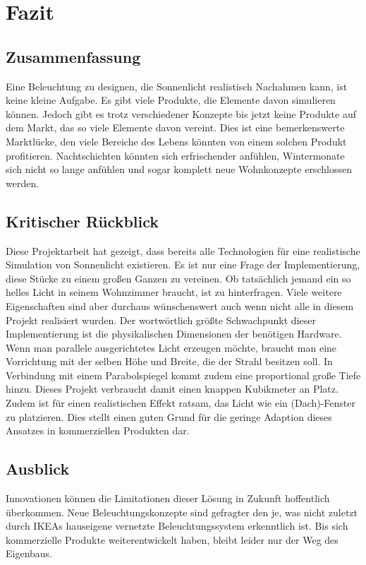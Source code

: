 \chapter{Fazit}

\section{Zusammenfassung}
Eine Beleuchtung zu designen, die Sonnenlicht realistisch Nachahmen kann, ist keine kleine Aufgabe. Es gibt viele Produkte, die Elemente davon simulieren können. Jedoch gibt es trotz verschiedener Konzepte bis jetzt keine Produkte auf dem Markt, das so viele Elemente davon vereint. Dies ist eine bemerkenswerte Marktlücke, den viele Bereiche des Lebens könnten von einem solchen Produkt profitieren. Nachtschichten könnten sich erfrischender anfühlen, Wintermonate sich nicht so lange anfühlen und sogar komplett neue Wohnkonzepte erschlossen werden.

\section{Kritischer Rückblick}
Diese Projektarbeit hat gezeigt, dass bereits alle Technologien für eine realistische Simulation von Sonnenlicht existieren. Es ist nur eine Frage der Implementierung, diese Stücke zu einem großen Ganzen zu vereinen. Ob tatsächlich jemand ein so helles Licht in seinem Wohnzimmer braucht, ist zu hinterfragen. Viele weitere Eigenschaften sind aber durchaus wünschenswert auch wenn nicht alle in diesem Projekt realisiert wurden. Der wortwörtlich größte Schwachpunkt dieser Implementierung ist die physikalischen Dimensionen der benötigen Hardware. Wenn man parallele ausgerichtetes Licht erzeugen möchte, braucht man eine Vorrichtung mit der selben Höhe und Breite, die der Strahl besitzen soll. In Verbindung mit einem Parabolspiegel kommt zudem eine proportional große Tiefe hinzu. Dieses Projekt verbraucht damit einen knappen Kubikmeter an Platz. Zudem ist für einen realistischen Effekt ratsam, das Licht wie ein (Dach)-Fenster zu platzieren. Dies stellt einen guten Grund für die geringe Adaption dieses Ansatzes in kommerziellen Produkten dar. 

\section{Ausblick}
Innovationen können die Limitationen dieser Lösung in Zukunft hoffentlich überkommen. Neue Beleuchtungskonzepte sind gefragter den je, was nicht zuletzt durch IKEAs hauseigene vernetzte Beleuchtungssystem erkenntlich ist. Bis sich kommerzielle Produkte weiterentwickelt haben, bleibt leider nur der Weg des Eigenbaus.